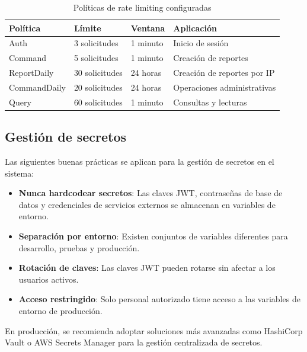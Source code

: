 \documentclass[12pt,letterpaper]{article}
\begin{document}
\begin{table}[H]
\centering
\caption{Políticas de rate limiting configuradas}
\label{tab:rate-limiting}
\begin{tabular}{|l|l|l|l|}
\hline
\textbf{Política} & \textbf{Límite} & \textbf{Ventana} & \textbf{Aplicación} \\ \hline
Auth & 3 solicitudes & 1 minuto & Inicio de sesión \\ \hline
Command & 5 solicitudes & 1 minuto & Creación de reportes \\ \hline
ReportDaily & 30 solicitudes & 24 horas & Creación de reportes por IP \\ \hline
CommandDaily & 20 solicitudes & 24 horas & Operaciones administrativas \\ \hline
Query & 60 solicitudes & 1 minuto & Consultas y lecturas \\ \hline
\end{tabular}
\end{table}

\subsection{Gestión de secretos}

Las siguientes buenas prácticas se aplican para la gestión de secretos en el sistema:

\begin{itemize}
    \item \textbf{Nunca hardcodear secretos}: Las claves JWT, contraseñas de base de datos y credenciales de servicios externos se almacenan en variables de entorno.
    \item \textbf{Separación por entorno}: Existen conjuntos de variables diferentes para desarrollo, pruebas y producción.
    \item \textbf{Rotación de claves}: Las claves JWT pueden rotarse sin afectar a los usuarios activos.
    \item \textbf{Acceso restringido}: Solo personal autorizado tiene acceso a las variables de entorno de producción.
\end{itemize}

En producción, se recomienda adoptar soluciones más avanzadas como HashiCorp Vault o AWS Secrets Manager para la gestión centralizada de secretos.
\end{document}
